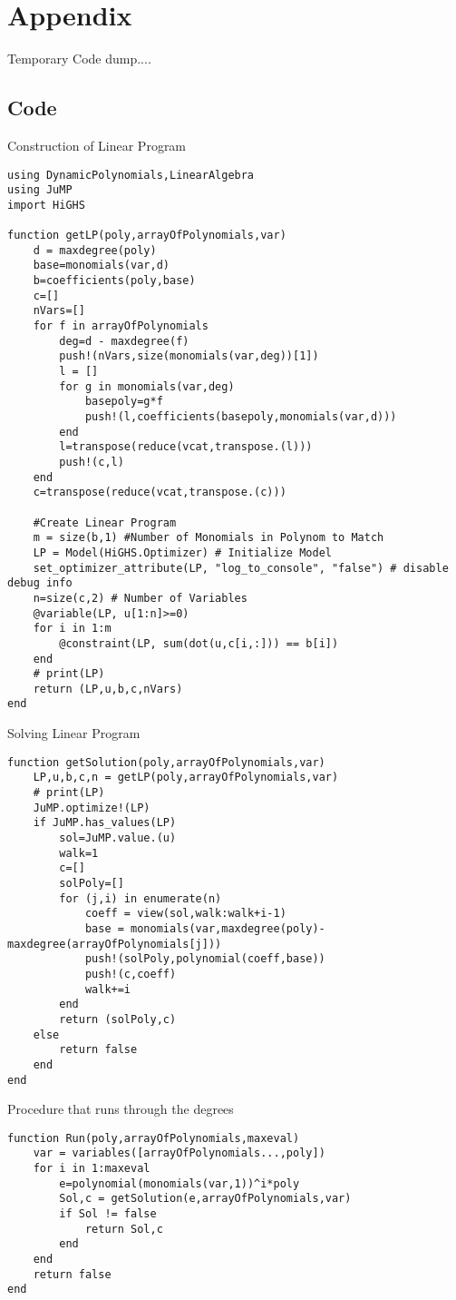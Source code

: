 \documentclass[./main.tex]{subfiles}
\begin{document}
\section{Appendix}
Temporary Code dump....
\subsection{Code}
Construction of Linear Program
\begin{lstlisting}
using DynamicPolynomials,LinearAlgebra
using JuMP
import HiGHS

function getLP(poly,arrayOfPolynomials,var)
    d = maxdegree(poly)
    base=monomials(var,d)
    b=coefficients(poly,base)
    c=[]
    nVars=[]
    for f in arrayOfPolynomials
        deg=d - maxdegree(f)
        push!(nVars,size(monomials(var,deg))[1])
        l = []
        for g in monomials(var,deg)
            basepoly=g*f
            push!(l,coefficients(basepoly,monomials(var,d)))
        end
        l=transpose(reduce(vcat,transpose.(l)))
        push!(c,l)
    end
    c=transpose(reduce(vcat,transpose.(c)))
    
    #Create Linear Program
    m = size(b,1) #Number of Monomials in Polynom to Match
    LP = Model(HiGHS.Optimizer) # Initialize Model
    set_optimizer_attribute(LP, "log_to_console", "false") # disable debug info
    n=size(c,2) # Number of Variables
    @variable(LP, u[1:n]>=0)
    for i in 1:m
        @constraint(LP, sum(dot(u,c[i,:])) == b[i])
    end
    # print(LP)
    return (LP,u,b,c,nVars)
end
\end{lstlisting}
Solving Linear Program

\begin{lstlisting}
function getSolution(poly,arrayOfPolynomials,var)
    LP,u,b,c,n = getLP(poly,arrayOfPolynomials,var)
    # print(LP)
    JuMP.optimize!(LP)
    if JuMP.has_values(LP)
        sol=JuMP.value.(u)
        walk=1
        c=[]
        solPoly=[]
        for (j,i) in enumerate(n)
            coeff = view(sol,walk:walk+i-1)
            base = monomials(var,maxdegree(poly)-maxdegree(arrayOfPolynomials[j]))
            push!(solPoly,polynomial(coeff,base))
            push!(c,coeff)
            walk+=i
        end
        return (solPoly,c)
    else
        return false
    end
end
\end{lstlisting}
Procedure that runs through the degrees

\begin{lstlisting}
function Run(poly,arrayOfPolynomials,maxeval)
    var = variables([arrayOfPolynomials...,poly])
    for i in 1:maxeval
        e=polynomial(monomials(var,1))^i*poly
        Sol,c = getSolution(e,arrayOfPolynomials,var)
        if Sol != false
            return Sol,c
        end
    end    
    return false
end
\end{lstlisting}
\end{document}
